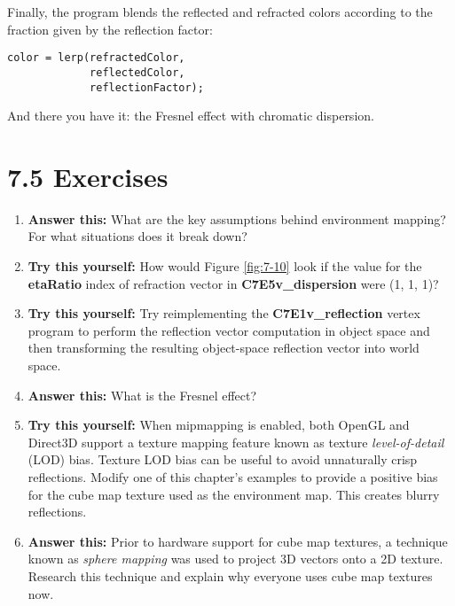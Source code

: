 \documentclass[../main.tex]{subfiles}
\begin{document}
Finally, the program blends the reflected and refracted colors according to the fraction given by the reflection factor:

\FloatBarrier
\begin{lstlisting}
color = lerp(refractedColor,
             reflectedColor,
             reflectionFactor);
\end{lstlisting}
\FloatBarrier

And there you have it: the Fresnel effect with chromatic dispersion.

\section{7.5 Exercises}

\begin{enumerate}

\item \textbf{Answer this:} What are the key assumptions behind environment mapping? For what situations does it break down?

\item \textbf{Try this yourself:} How would Figure \ref{fig:7-10} look if the value for the \textbf{etaRatio} index of refraction vector in \textbf{C7E5v_dispersion} were (1, 1, 1)?

\item \textbf{Try this yourself:} Try reimplementing the \textbf{C7E1v_reflection} vertex program to perform the reflection vector computation in object space and then transforming the resulting object-space reflection vector into world space.

\item \textbf{Answer this:} What is the Fresnel effect?

\item \textbf{Try this yourself:} When mipmapping is enabled, both OpenGL and Direct3D support a texture mapping feature known as texture \textit{level-of-detail} (LOD) bias. Texture LOD bias can be useful to avoid unnaturally crisp reflections. Modify one of this chapter's examples to provide a positive bias for the cube map texture used as the environment map. This creates blurry reflections.

\item \textbf{Answer this:} Prior to hardware support for cube map textures, a technique known as \textit{sphere mapping} was used to project 3D vectors onto a 2D texture. Research this technique and explain why everyone uses cube map textures now.

\end{enumerate}
\end{document}
